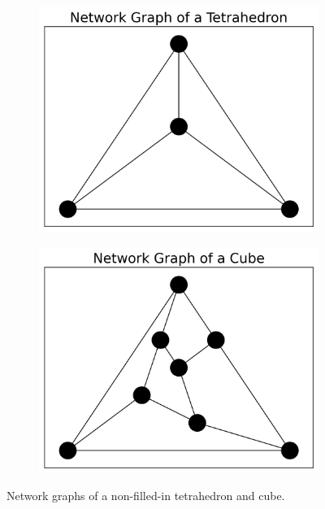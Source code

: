 \documentclass[ma]{uncgdissertationexp}
\theoremstyle{plain}
\theoremstyle{definition}
\theoremstyle{remark}
\begin{document}
\begin{figure}[H]
    \centering
    \begin{subfigure}[b]{0.3\textwidth}
        \centering
        \includegraphics[width=\textwidth]{networkx_tetra.png}
    \end{subfigure}
    \begin{subfigure}[b]{0.3\textwidth}
        \centering
        \includegraphics[width=\textwidth]{networkx_cube.png}
    \end{subfigure}
    \caption{Network graphs of a non-filled-in tetrahedron and cube.}
\end{figure}
\end{document}
